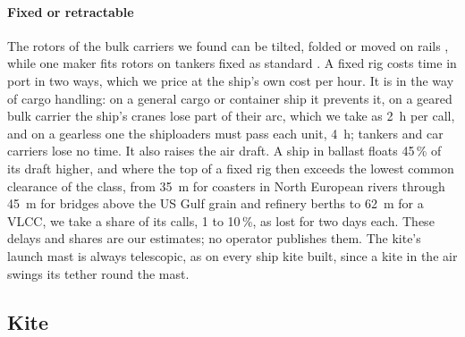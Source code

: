 \paragraph{Fixed or retractable} The rotors of the bulk carriers we found can be tilted, folded or moved on rails \citep{gcaptain2021seazhoushan,maritimeexecutive2024sohar,anemoi2026}, while one maker fits rotors on tankers fixed as standard \citep{anemoi_deploy}. A fixed rig costs time in port in two ways, which we price at the ship's own cost per hour. It is in the way of cargo handling: on a general cargo or container ship it prevents it, on a geared bulk carrier the ship's cranes lose part of their arc, which we take as \SI{2}{h} per call, and on a gearless one the shiploaders must pass each unit, \SI{4}{h}; tankers and car carriers lose no time. It also raises the air draft. A ship in ballast floats 45\,\% of its draft higher, and where the top of a fixed rig then exceeds the lowest common clearance of the class, from \SI{35}{m} for coasters in North European rivers through \SI{45}{m} for bridges above the US Gulf grain and refinery berths to \SI{62}{m} for a VLCC, we take a share of its calls, 1 to 10\,\%, as lost for two days each. These delays and shares are our estimates; no operator publishes them. The kite's launch mast is always telescopic, as on every ship kite built, since a kite in the air swings its tether round the mast.

\subsection{Kite}
\label{sec:det_kite}

